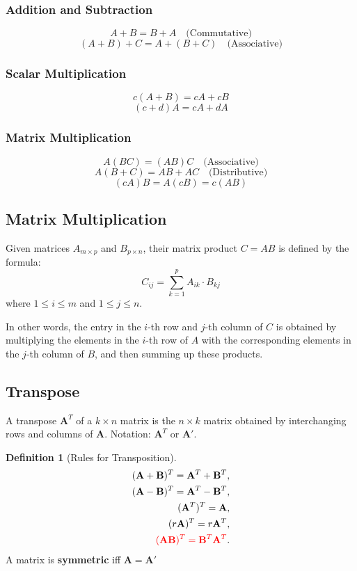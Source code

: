\documentclass[11pt,a4paper]{book}
\newcommand{\red}[1]{\textcolor{red}{#1}}
\theoremstyle{definition}\newtheorem{definition}{Definition}
\theoremstyle{definition}\newtheorem{fact}{Fact}
\theoremstyle{definition}\newtheorem{remark}{Remark}
\theoremstyle{definition}\newtheorem{ex}{Ex.}
\theoremstyle{definition}\newtheorem{project}{Project}
\theoremstyle{definition}\newtheorem{problem}{Problem}
\theoremstyle{definition}\newtheorem{example}{Example}
\newenvironment{fdefinition}
{\begin{mdframed}\begin{definition}}
		{\end{definition}\end{mdframed}}
\numberwithin{theorem}{section}
\numberwithin{corollary}{chapter}
\numberwithin{assumption}{chapter}
\numberwithin{definition}{chapter}
\numberwithin{prop}{chapter}
\numberwithin{notation}{chapter}
\numberwithin{problem}{chapter}
\numberwithin{example}{chapter}
\numberwithin{fact}{chapter}
\numberwithin{ex}{chapter}
\def\A{\mathbf A}
\def\B{\mathbf B}
\begin{document}
\begin{appendices}
	\subsubsection*{Addition and Subtraction}
	\[
	A + B = B + A \quad \text{(Commutative)}
	\]
	\[
	(A + B) + C = A + (B + C) \quad \text{(Associative)}
	\]
	
	\subsubsection*{Scalar Multiplication}
	\[
	c(A + B) = cA + cB
	\]
	\[
	(c + d)A = cA + dA
	\]
	
	\subsubsection*{Matrix Multiplication}
	\[
	A(BC) = (AB)C \quad \text{(Associative)}
	\]
	\[
	A(B + C) = AB + AC \quad \text{(Distributive)}
	\]
	\[
	(cA)B = A(cB) = c(AB)
	\]
	\subsection*{Matrix Multiplication}
	
	Given matrices \( A_{m \times p} \) and \( B_{p \times n} \), their matrix product \( C = AB \) is defined by the formula:
	\[
	C_{ij} = \sum_{k=1}^{p} A_{ik} \cdot B_{kj}
	\]
	where \( 1 \leq i \leq m \) and \( 1 \leq j \leq n \).
	
	In other words, the entry in the \( i \)-th row and \( j \)-th column of \( C \) is obtained by multiplying the elements in the \( i \)-th row of \( A \) with the corresponding elements in the \( j \)-th column of \( B \), and then summing up these products.
	
	\subsection*{Transpose}
	A transpose $\A^T$ of a $k \times n$ matrix is the $n\times k$ matrix obtained by interchanging rows and columns of $\A$. Notation: $\A^T$ or $\A'$.
	
	\begin{fdefinition}[Rules for Transposition]
		\begin{align*}
			(\A+\B)^T = \A^T + \B^T,    \\
			(\A-\B)^T = \A^T - \B^T,    \\
			(\A^T)^T = \A,              \\
			(r\A)^T = r\A^T,            \\
			\red{(\A\B)^T = \B^T \A^T}. 
		\end{align*}
		A matrix is \textbf{symmetric} iff $\A = \A'$
	\end{fdefinition}
	

\end{appendices}
\end{document}
